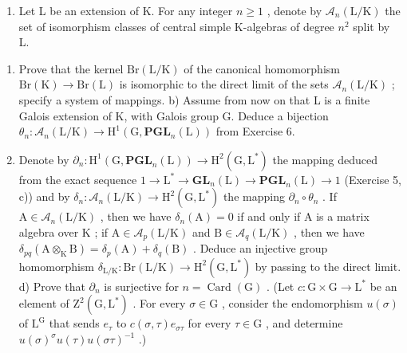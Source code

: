 \begin{enumerate}
\def\labelenumi{\arabic{enumi})}
\setcounter{enumi}{6}
\tightlist
\item
  Let L be an extension of K. For any integer \(n \geqslant 1\) , denote by \(\mathcal{A}_{n}(\mathrm{L}/\mathrm{K})\) the set of isomorphism classes of central simple K-algebras of degree \(n^{2}\) split by L.
\end{enumerate}

\begin{enumerate}
\def\labelenumi{\alph{enumi})}
\item
  Prove that the kernel \(\mathrm{Br}(\mathrm{L} / \mathrm{K})\) of the canonical homomorphism \(\mathrm{Br}(\mathrm{K})\to \mathrm{Br}(\mathrm{L})\) is isomorphic to the direct limit of the sets \(\mathcal{A}_n(\mathrm{L} / \mathrm{K})\) ; specify a system of mappings. b) Assume from now on that L is a finite Galois extension of K, with Galois group G. Deduce a bijection \(\theta_{n}:\mathcal{A}_{n}(\mathrm{L} / \mathrm{K})\to \mathrm{H}^{1}(\mathrm{G},\mathbf{PGL}_{n}(\mathrm{L}))\) from Exercise 6.
\item
  Denote by \(\partial_n: \mathrm{H}^1(\mathrm{G}, \mathbf{PGL}_n(\mathrm{L})) \to \mathrm{H}^2(\mathrm{G}, \mathrm{L}^*)\) the mapping deduced from the exact sequence \(1 \to \mathrm{L}^* \to \mathbf{GL}_n(\mathrm{L}) \to \mathbf{PGL}_n(\mathrm{L}) \to 1\) (Exercise 5, c)) and by \(\delta_n: \mathcal{A}_n(\mathrm{L/K}) \to \mathrm{H}^2(\mathrm{G}, \mathrm{L}^*)\) the mapping \(\partial_n \circ \theta_n\) . If \(\mathrm{A} \in \mathcal{A}_n(\mathrm{L/K})\) , then we have \(\delta_n(\mathrm{A}) = 0\) if and only if \(\mathrm{A}\) is a matrix algebra over \(\mathrm{K}\) ; if \(\mathrm{A} \in \mathcal{A}_p(\mathrm{L/K})\) and \(\mathrm{B} \in \mathcal{A}_q(\mathrm{L/K})\) , then we have \(\delta_{pq}(\mathrm{A} \otimes_{\mathrm{K}} \mathrm{B}) = \delta_p(\mathrm{A}) + \delta_q(\mathrm{B})\) . Deduce an injective group homomorphism \(\delta_{\mathrm{L/K}}: \mathrm{Br}(\mathrm{L/K}) \to \mathrm{H}^2(\mathrm{G}, \mathrm{L}^*)\) by passing to the direct limit. d) Prove that \(\partial_n\) is surjective for \(n = \operatorname{Card}(\mathrm{G})\) . (Let \(c: \mathrm{G} \times \mathrm{G} \to \mathrm{L}^*\) be an element of \(\mathrm{Z}^2(\mathrm{G}, \mathrm{L}^*)\) . For every \(\sigma \in \mathrm{G}\) , consider the endomorphism \(u(\sigma)\) of \(\mathrm{L}^{\mathrm{G}}\) that sends \(e_\tau\) to \(c(\sigma, \tau)e_{\sigma\tau}\) for every \(\tau \in \mathrm{G}\) , and determine \(u(\sigma)^{\sigma}u(\tau)u(\sigma\tau)^{-1}\) .)

\end{enumerate}
